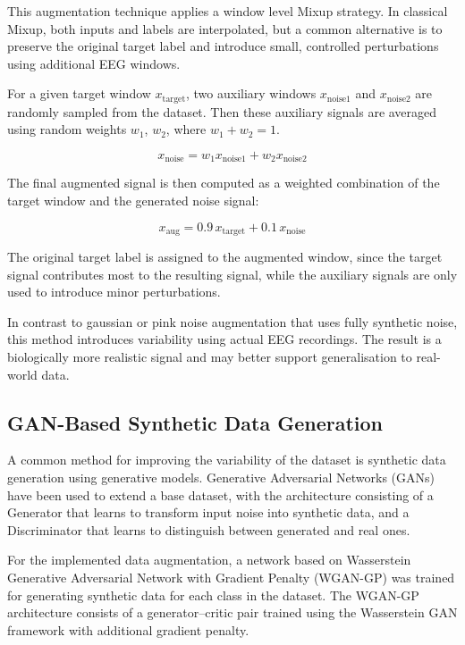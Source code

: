 This augmentation technique applies a window level Mixup strategy. In classical Mixup, both inputs and labels are interpolated, but a common alternative is to preserve the original target label and introduce small, controlled perturbations using additional EEG windows.

For a given target window $x_{\text{target}}$, two auxiliary windows $x_{\text{noise1}}$ and $x_{\text{noise2}}$ are randomly sampled from the dataset. Then these auxiliary signals are averaged using random weights $w_1$, $w_2$, where $w_1 + w_2 = 1$.

\[
x_{\text{noise}} = w_1 x_{\text{noise1}} + w_2 x_{\text{noise2}}
\]

The final augmented signal is then computed as a weighted combination of the target window and the generated noise signal: 

\[
x_{\text{aug}} = 0.9 \, x_{\text{target}} + 0.1 \, x_{\text{noise}}
\]

The original target label is assigned to the augmented window, since the target signal contributes most to the resulting signal, while the auxiliary signals are only used to introduce minor perturbations. 

In contrast to gaussian or pink noise augmentation that uses fully synthetic noise, this method introduces variability using actual EEG recordings. The result is a biologically more realistic signal and may better support generalisation to real-world data.

\subsection{GAN-Based Synthetic Data Generation}

A common method for improving the variability of the dataset is synthetic data generation using generative models. Generative Adversarial Networks (GANs) have been used to extend a base dataset, with the architecture consisting of a Generator that learns to transform input noise into synthetic data, and a Discriminator that learns to distinguish between generated and real ones. 

For the implemented data augmentation, a network based on Wasserstein Generative Adversarial Network with Gradient Penalty (WGAN-GP) \cite{gulrajani2017} was trained for generating synthetic data for each class in the dataset. The WGAN-GP architecture consists of a generator–critic pair trained using the Wasserstein GAN framework with additional gradient penalty. 

